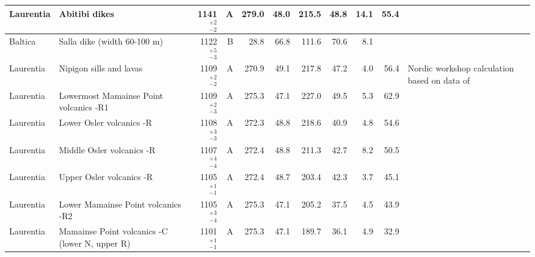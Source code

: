 \documentclass[twocolumn, switch]{article} %
\begin{document}
{\begin{landscape}
\begin{ThreePartTable}
\begin{longtable}{p{1.4 in}p{1.2 in}rrrrrrrrp{1.2 in}}
                     Laurentia &                                      Abitibi dikes &     1141$^{+2}_{-2}$ &      A &     279.0 &      48.0 & 215.5 &  48.8 &      14.1 &        55.4 &                                  \cite{Ernst1993a} \\ \hline                       Baltica &                        Salla dike (width 60-100 m) &     1122$^{+5}_{-3}$ &      B &      28.8 &      66.8 & 111.6 &  70.6 &       8.1 &          &                                                 \\ \hline
                     Laurentia &                            Nipigon sills and lavas &     1109$^{+2}_{-2}$ &      A &     270.9 &      49.1 & 217.8 &  47.2 &       4.0 &        56.4 &  Nordic workshop calculation based on data of \cite{Palmer1970a, Robertson1971a, Pesonen1979a, Pesonen1979b, Middleton2004a, Borradaile2006a} \\ \hline
                     Laurentia &             Lowermost Mamainse Point volcanics -R1 &     1109$^{+2}_{-3}$ &      A &     275.3 &      47.1 & 227.0 &  49.5 &       5.3 &        62.9 &                         \cite{Swanson-Hysell2014a} \\ \hline
                     Laurentia &                           Lower Osler volcanics -R &     1108$^{+3}_{-3}$ &      A &     272.3 &      48.8 & 218.6 &  40.9 &       4.8 &        54.6 &                         \cite{Swanson-Hysell2014b} \\ \hline
                     Laurentia &                          Middle Osler volcanics -R &     1107$^{+4}_{-4}$ &      A &     272.4 &      48.8 & 211.3 &  42.7 &       8.2 &        50.5 &                         \cite{Swanson-Hysell2014b} \\ \hline
                     Laurentia &                           Upper Osler volcanics -R &     1105$^{+1}_{-1}$ &      A &     272.4 &      48.7 & 203.4 &  42.3 &       3.7 &        45.1 &  \cite{Halls1974a, Swanson-Hysell2014b, Swanson-Hysell2019a} \\ \hline
                     Laurentia &                 Lower Mamainse Point volcanics -R2 &     1105$^{+3}_{-4}$ &      A &     275.3 &      47.1 & 205.2 &  37.5 &       4.5 &        43.9 &                         \cite{Swanson-Hysell2014a} \\ \hline
                     Laurentia &     Mamainse Point volcanics -C (lower N, upper R) &     1101$^{+1}_{-1}$ &      A &     275.3 &      47.1 & 189.7 &  36.1 &       4.9 &        32.9 &                         \cite{Swanson-Hysell2014a} \\ \hline

\end{longtable}
\end{ThreePartTable}
\end{landscape}}
\end{document}

